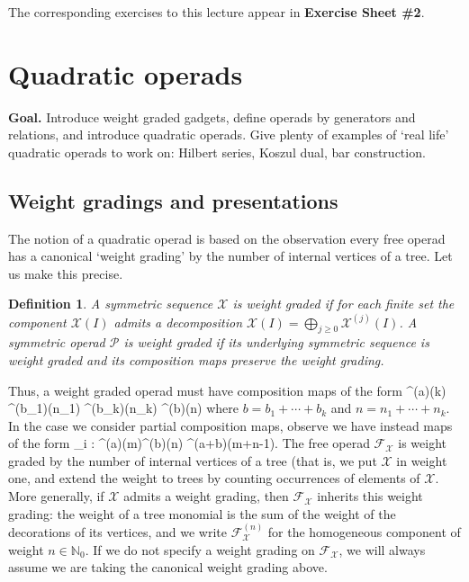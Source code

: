 \documentclass[fleqn,a4paper, twoside]{article}
\makeatletter
\newcommand{\0}{\langle 0\rangle}
\newcommand{\XX}{\mathcal{X}}
\newcommand{\FF}{\mathcal{F}}
\let\[\@undefined
\DeclareRobustCommand{\[}{\begin{equation}}%
\let\]\@undefined
\DeclareRobustCommand{\]}{\end{equation}}%
\theoremstyle{mytheorem}
\theoremstyle{introthm}
\theoremstyle{mydefinition}
\newtheorem{definition}[theorem]{Definition}
\newtheorem{note}[theorem]{Note}
\theoremstyle{mydefinition2}
\theoremstyle{plain} %
\newcommand{\?}{\,?\,}
\newcommand{\NN}{\mathbb N}
\newcommand{\PP}{{\mathcal{P}}}
\theoremstyle{mytheorem}
\theoremstyle{plain} %
\makeatother
\begin{document}
The corresponding exercises to this lecture appear in \textbf{Exercise Sheet \#2}.

\pagebreak


\section{Quadratic operads}

 \textbf{Goal.} Introduce weight graded gadgets,
 define operads by generators and relations, and
 introduce quadratic operads. Give plenty of examples
 of `real life' quadratic operads to work on:
 Hilbert series, Koszul dual, bar construction. 
 
 \subsection{Weight gradings and presentations}
 The notion of a quadratic operad is based on the observation
 every free operad has a canonical `weight grading' by the
 number of internal vertices of a tree. Let us make this
 precise.
 
\begin{definition}
A symmetric sequence $\XX$ is weight graded if for
each finite set the component $\XX(I)$ admits a 
decomposition $\XX(I) = \bigoplus_{j\geqslant 0}
\XX^{(j)}(I)$. A symmetric operad $\PP$ is weight
graded if its underlying symmetric sequence
is weight graded and its composition maps
preserve the weight grading.
\end{definition}

Thus, a weight graded operad must have composition maps 
of the form
\[ \PP^{(a)}(k) \otimes 
	\PP^{(b_1)}(n_1) \otimes \cdots \otimes \PP^{(b_k)}(n_k)
	 	\longrightarrow \PP^{(b)}(n) \]
where $b=b_1+\cdots+b_k$ and $n = n_1+\cdots+n_k$. In the
case we consider partial composition maps, observe we have
instead maps of the form
\[\circ_i :  \PP^{(a)}(m)\otimes  \PP^{(b)}(n)
	\longrightarrow  \PP^{(a+b)}(m+n-1). \] 
The free operad $\FF_\XX$ is weight graded by the number
of internal vertices of a tree (that is, we put $\XX$ in
weight one, and extend the weight to trees by counting 
occurrences of elements of $\XX$. More generally, if
$\XX$ admits a weight grading, then $\FF_\XX$ inherits
this weight grading: the weight of a tree monomial is the
sum of the weight of the decorations of its vertices,
 and we write $\FF_\XX^{(n)}$ for the
homogeneous component of weight $n\in\NN_0$. If we do
not specify a weight grading on $\FF_\XX$, we will 
always assume we are taking the canonical weight grading above.
\end{document}
